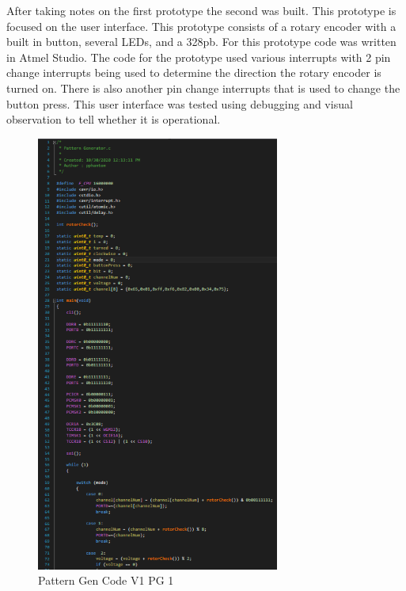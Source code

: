 \documentclass[12pt]{article}
\begin{document}
        \newpage

        \par After taking notes on the first prototype the second was built. This prototype is focused on the user interface. This prototype consists of a rotary encoder with a built in button, several LEDs, and a 328pb. For this prototype code was written in Atmel Studio. The code for the prototype used various interrupts with 2 pin change interrupts being used to determine the direction the rotary encoder is turned on. There is also another pin change interrupts that is used to change the button press. This user interface was tested using debugging and visual observation to tell whether it is operational. 

        \begin{figure}[htp]
            \centering
            \includegraphics[width=8cm]{Pattern Gen Code V1 PG 1.png}
            \caption{Pattern Gen Code V1 PG 1}
        \end{figure}
\end{document}
